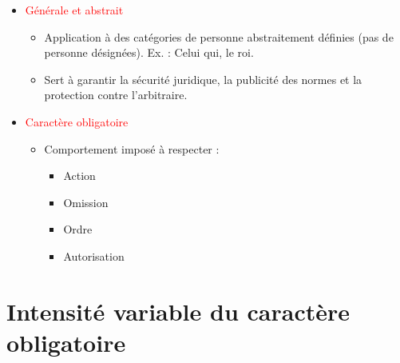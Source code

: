 \begin{itemize}
    \item \textcolor{red}{Générale et abstrait}
        \begin{itemize}
            \item Application à des catégories de personne abstraitement définies (pas de personne désignées). Ex. : Celui qui, le roi.
            \item Sert à garantir la sécurité juridique, la publicité des normes et la protection contre l'arbitraire.
        \end{itemize}
    \item \textcolor{red}{Caractère obligatoire}
        \begin{itemize}
            \item Comportement imposé à respecter :
                \begin{itemize}
                    \item Action
                    \item Omission
                    \item Ordre
                    \item Autorisation
                \end{itemize}
        \end{itemize}
\end{itemize}

\section{Intensité variable du caractère obligatoire}

